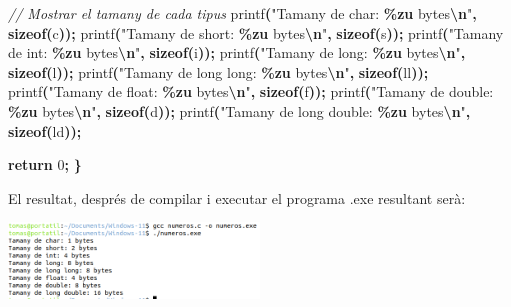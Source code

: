 \documentclass[
  12 pt,
  a4paper,
]{article}
\newenvironment{Shaded}{\begin{snugshade}}{\end{snugshade}}
\newcommand{\CommentTok}[1]{\textcolor[rgb]{0.56,0.35,0.01}{\textit{#1}}}
\newcommand{\ControlFlowTok}[1]{\textcolor[rgb]{0.13,0.29,0.53}{\textbf{#1}}}
\newcommand{\DecValTok}[1]{\textcolor[rgb]{0.00,0.00,0.81}{#1}}
\newcommand{\KeywordTok}[1]{\textcolor[rgb]{0.13,0.29,0.53}{\textbf{#1}}}
\newcommand{\NormalTok}[1]{#1}
\newcommand{\OperatorTok}[1]{\textcolor[rgb]{0.81,0.36,0.00}{\textbf{#1}}}
\newcommand{\SpecialCharTok}[1]{\textcolor[rgb]{0.81,0.36,0.00}{\textbf{#1}}}
\newcommand{\StringTok}[1]{\textcolor[rgb]{0.31,0.60,0.02}{#1}}
\begin{document}
\begin{Shaded}
\begin{Highlighting}[]
    \CommentTok{// Mostrar el tamany de cada tipus}
\NormalTok{    printf}\OperatorTok{(}\StringTok{"Tamany de char: }\SpecialCharTok{\%zu}\StringTok{ bytes}\SpecialCharTok{\textbackslash{}n}\StringTok{"}\OperatorTok{,} \KeywordTok{sizeof}\OperatorTok{(}\NormalTok{c}\OperatorTok{));}
\NormalTok{    printf}\OperatorTok{(}\StringTok{"Tamany de short: }\SpecialCharTok{\%zu}\StringTok{ bytes}\SpecialCharTok{\textbackslash{}n}\StringTok{"}\OperatorTok{,} \KeywordTok{sizeof}\OperatorTok{(}\NormalTok{s}\OperatorTok{));}
\NormalTok{    printf}\OperatorTok{(}\StringTok{"Tamany de int: }\SpecialCharTok{\%zu}\StringTok{ bytes}\SpecialCharTok{\textbackslash{}n}\StringTok{"}\OperatorTok{,} \KeywordTok{sizeof}\OperatorTok{(}\NormalTok{i}\OperatorTok{));}
\NormalTok{    printf}\OperatorTok{(}\StringTok{"Tamany de long: }\SpecialCharTok{\%zu}\StringTok{ bytes}\SpecialCharTok{\textbackslash{}n}\StringTok{"}\OperatorTok{,} \KeywordTok{sizeof}\OperatorTok{(}\NormalTok{l}\OperatorTok{));}
\NormalTok{    printf}\OperatorTok{(}\StringTok{"Tamany de long long: }\SpecialCharTok{\%zu}\StringTok{ bytes}\SpecialCharTok{\textbackslash{}n}\StringTok{"}\OperatorTok{,} \KeywordTok{sizeof}\OperatorTok{(}\NormalTok{ll}\OperatorTok{));}
\NormalTok{    printf}\OperatorTok{(}\StringTok{"Tamany de float: }\SpecialCharTok{\%zu}\StringTok{ bytes}\SpecialCharTok{\textbackslash{}n}\StringTok{"}\OperatorTok{,} \KeywordTok{sizeof}\OperatorTok{(}\NormalTok{f}\OperatorTok{));}
\NormalTok{    printf}\OperatorTok{(}\StringTok{"Tamany de double: }\SpecialCharTok{\%zu}\StringTok{ bytes}\SpecialCharTok{\textbackslash{}n}\StringTok{"}\OperatorTok{,} \KeywordTok{sizeof}\OperatorTok{(}\NormalTok{d}\OperatorTok{));}
\NormalTok{    printf}\OperatorTok{(}\StringTok{"Tamany de long double: }\SpecialCharTok{\%zu}\StringTok{ bytes}\SpecialCharTok{\textbackslash{}n}\StringTok{"}\OperatorTok{,} \KeywordTok{sizeof}\OperatorTok{(}\NormalTok{ld}\OperatorTok{));}

    \ControlFlowTok{return} \DecValTok{0}\OperatorTok{;}
\OperatorTok{\}}
\end{Highlighting}
\end{Shaded}

El resultat, després de compilar i executar el programa .exe resultant
serà:

\includegraphics[width=0.5\textwidth,height=\textheight]{png/numeros.exe.png}
\end{document}

